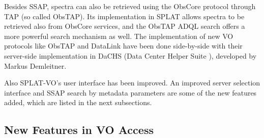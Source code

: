 \documentclass[final,authoryear,5p,times,twocolumn]{elsarticle}
\begin{document}
Besides SSAP, spectra can also be retrieved using the ObsCore protocol
through TAP (so called ObsTAP\cite{obstap}). Its implementation in
SPLAT allows spectra to be retrieved also from ObsCore services, and
the ObsTAP ADQL\cite{adql} search offers a more powerful search
mechanism as well. The implementation of new VO protocols like ObsTAP
and DataLink have been done side-by-side with their server-side
implementation in DaCHS (Data Center Helper Suite \cite{dachs}),
developed by Markus Demleitner.

Also SPLAT-VO's user interface has been improved. An improved server
selection interface and SSAP search by metadata parameters are some of
the new features added, which are listed in the next subsections.

\subsection{New Features in VO Access}
\end{document}
